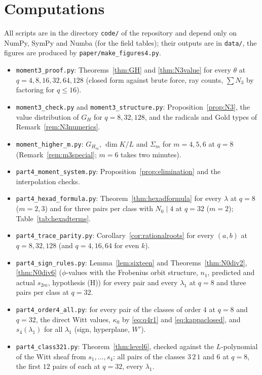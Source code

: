\documentclass[12pt,a4paper]{amsart}
\theoremstyle{definition}
\begin{document}
\section*{Computations}
All scripts are in the directory \texttt{code/} of the repository and depend only on NumPy, SymPy and Numba (for the field tables); their outputs are in \texttt{data/}, the figures are produced by \texttt{paper/make\_figures4.py}.
\begin{itemize}[leftmargin=2em]
\item \texttt{moment3\_proof.py}: Theorems~\ref{thm:GH} and \ref{thm:N3value} for every $\theta$ at $q=4,8,16,32,64,128$ (closed form against brute force, ray counts, $\sum N_3$ by factoring for $q\le16$).
\item \texttt{moment3\_check.py} and \texttt{moment3\_structure.py}: Proposition~\ref{prop:N3}, the value distribution of $G_H$ for $q=8,32,128$, and the radicals and Gold types of Remark~\ref{rem:N3numerics}.
\item \texttt{moment\_higher\_m.py}: $G_{H_m}$, $\dim K/L$ and $\Sigma_m$ for $m=4,5,6$ at $q=8$ (Remark~\ref{rem:m3special}; $m=6$ takes two minutes).
\item \texttt{part4\_moment\_system.py}: Proposition~\ref{prop:elimination} and the interpolation checks.
\item \texttt{part4\_hexad\_formula.py}: Theorem~\ref{thm:hexadformula} for every $\lambda$ at $q=8$ ($m=2,3$) and for three pairs per class with $N_0\mid4$ at $q=32$ ($m=2$); Table~\ref{tab:hexadterms}.
\item \texttt{part4\_trace\_parity.py}: Corollary~\ref{cor:rationalroots} for every $(a,b)$ at $q=8,32,128$ (and $q=4,16,64$ for even $k$).
\item \texttt{part4\_sign\_rules.py}: Lemma~\ref{lem:sixteen} and Theorems~\ref{thm:N0div2}, \ref{thm:N0div6} ($\phi$-values with the Frobenius orbit structure, $n_1$, predicted and actual $s_{2m}$, hypothesis (H)) for every pair and every $\lambda_1$ at $q=8$ and three pairs per class at $q=32$.
\item \texttt{part4\_order4\_all.py}: for every pair of the classes of order $4$ at $q=8$ and $q=32$, the direct Witt values, $\kappa_0$ by \eqref{eq:q4r1} and \eqref{eq:kappaclosed}, and $s_4(\lambda_1)$ for all $\lambda_1$ (sign, hyperplane, $W'$).
\item \texttt{part4\_class321.py}: Theorem~\ref{thm:level6}, checked against the $L$-polynomial of the Witt sheaf from $s_1,\dots,s_4$: all pairs of the classes $3\,2\,1$ and $6$ at $q=8$, the first $12$ pairs of each at $q=32$, every $\lambda_1$.

\end{itemize}
\end{document}
